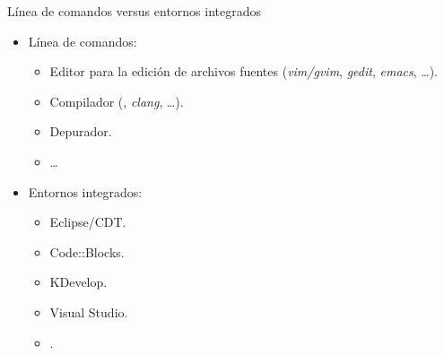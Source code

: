 \begin{frame}[t]{Línea de comandos versus entornos integrados}
\begin{itemize}
  \item Línea de comandos:
    \begin{itemize}
      \item Editor para la edición de archivos fuentes (\emph{vim/gvim}, \emph{gedit}, \emph{emacs}, \ldots).
      \item Compilador (, \emph{clang}, \ldots).
      \item Depurador.
      \item \ldots
    \end{itemize}
  \vfill
  \item Entornos integrados:
    \begin{itemize}
      \item Eclipse/CDT.
      \item Code::Blocks.
      \item KDevelop.
      \item Visual Studio.
      \item {}.
    \end{itemize}
\end{itemize}
\end{frame}
